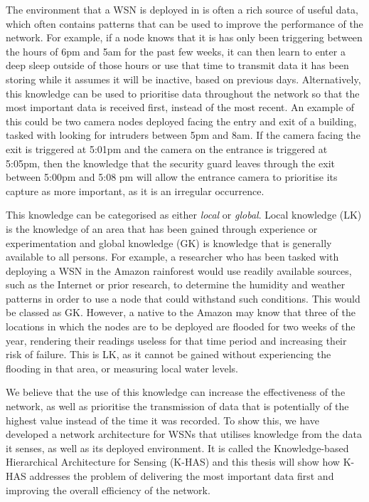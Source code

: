 The environment that a WSN is deployed in is often a rich source of useful data, which often contains patterns that can be used to improve the performance of the network. For example, if a node knows that it is has only been triggering between the hours of 6pm and 5am for the past few weeks, it can then learn to enter a deep sleep outside of those hours or use that time to transmit data it has been storing while it assumes it will be inactive, based on previous days. Alternatively, this knowledge can be used to prioritise data throughout the network so that the most important data is received first, instead of the most recent. An example of this could be two camera nodes deployed facing the entry and exit of a building, tasked with looking for intruders between 5pm and 8am. If the camera facing the exit is triggered at 5:01pm and the camera on the entrance is triggered at 5:05pm, then the knowledge that the security guard leaves through the exit between 5:00pm and 5:08 pm will allow the entrance camera to prioritise its capture as more important, as it is an irregular occurrence.

This knowledge can be categorised as either \textit{local} or \textit{global}. Local knowledge (LK)  is the knowledge of an area that has been gained through experience or experimentation \cite{Joshi2001} and global knowledge (GK) is knowledge that is generally available to all persons. For example, a researcher who has been tasked with deploying a WSN in the Amazon rainforest would use readily available sources, such as the Internet or prior research, to determine the humidity and weather patterns in order to use a node that could withstand such conditions. This would be classed as GK. However, a native to the Amazon may know that three of the locations in which the nodes are to be deployed are flooded for two weeks of the year, rendering their readings useless for that time period and increasing their risk of failure. This is LK, as it cannot be gained without experiencing the flooding in that area, or measuring local water levels.

We believe that the use of this knowledge can increase the effectiveness of the network, as well as prioritise the transmission of data that is potentially of the highest value instead of the time it was recorded. To show this, we have developed a network architecture for WSNs that utilises knowledge from the data it senses, as well as its deployed environment. It is called the Knowledge-based Hierarchical Architecture for Sensing (K-HAS)  and this thesis will show how K-HAS addresses the problem of delivering the most important data first and improving the overall efficiency of the network.

